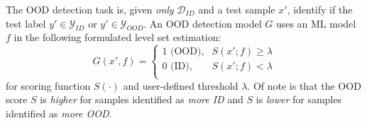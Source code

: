 The OOD detection task is, given \emph{only} $\mathcal{D}_{ID}$ and a test sample $x'$, identify if the test label $y' \in \mathcal{Y}_{ID}$ or $y' \in \mathcal{Y}_{OOD}$. An OOD detection model $G$ uses an ML model $f$ in the following formulated level set estimation:
\begin{equation}
  G(x', f) =
  \begin{cases}
    1 \text{\ (OOD),} & \text{$S(x'; f) \geq \lambda$} \\
    0 \text{\ (ID),} & \text{$S(x'; f) < \lambda$} \\
  \end{cases}
\end{equation}
for scoring function $S(\cdot)$ and user-defined threshold $\lambda$. Of note is that the OOD score $S$ is \textit{higher} for samples identified as \textit{more ID} and $S$ is \textit{lower} for samples identified as \textit{more OOD}.


